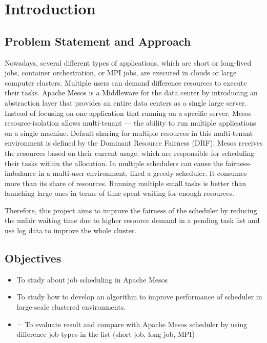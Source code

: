 \documentclass[12pt,oneside,openright,a4paper]{cpe-english-project}
\begin{document}


\chapter{Introduction}
\section{Problem Statement and Approach} 

\hspace{10mm}Nowadays, several different types of applications, which are short or long-lived jobs, container orchestration, or MPI jobs, are executed in clouds or large computer clusters. Multiple users can demand difference resources to execute their tasks. Apache Mesos is a Middleware for the data center by introducing an abstraction layer that provides an entire data centers as a single large server. Instead of focusing on one application that running on a specific server. Mesos resource-isolation allows multi-tenant — the ability to run multiple applications on a single machine. Default sharing for multiple resources in this multi-tenant environment is defined by the Dominant Resource Fairness (DRF). Mesos receives the resources based on their current usage, which are responsible for scheduling their tasks within the allocation. In multiple schedulers can cause the fairness-imbalance in a multi-user environment, liked a greedy scheduler. It consumes more than its share of resources. Running multiple small tasks is better than launching large ones in terms of time spent waiting for enough resources. 

\hspace{10mm}Therefore, this project aims to improve the fairness of the scheduler by reducing the unfair waiting time due to higher resource demand in a pending task list and use log data to improve the whole cluster.

\section{Objectives}
\begin{itemize}
  \item  To study about job scheduling in Apache Mesos
  \item  To study how to develop an algorithm to improve performance of scheduler in large-scale clustered environments.
  \item  ·	To evaluate result and compare with Apache Mesos scheduler by using difference job types in the list (short job, long job, MPI)
\end{itemize}
\end{document}
